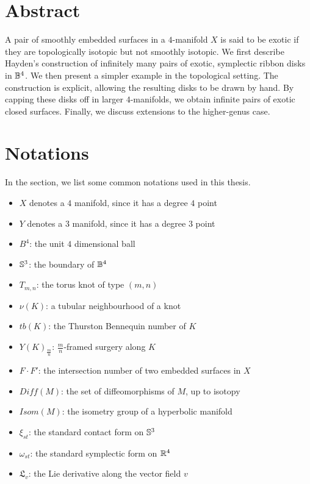 \documentclass[12pt,a4paper,oneside]{book}
\begin{document}
\chapter*{Abstract}
A pair of smoothly embedded surfaces in a $4$-manifold $X$ is said to be exotic if they are topologically isotopic but not smoothly isotopic. We first describe Hayden's construction of infinitely many pairs of exotic, symplectic ribbon disks in $\mathbb{B}^4$. We then present a simpler example in the topological setting. The construction is explicit, allowing the resulting disks to be drawn by hand. By capping these disks off in larger $4$-manifolds, we obtain infinite pairs of exotic closed surfaces. Finally, we discuss extensions to the higher-genus case.
\chapter*{Notations}
In the section, we list some common notations used in this thesis. 
\begin{itemize}
\item $X$ denotes a $4$ manifold, since it has a degree $4$ point
\item $Y$ denotes a $3$ manifold, since it has a degree $3$ point
\item $B^4$: the unit $4$ dimensional ball
\item $\mathbb{S}^3$: the boundary of $\mathbb{B}^4$
\item $T_{m, n}$: the torus knot of type $(m, n)$
\item $\nu(K)$: a tubular neighbourhood of a knot
\item $tb(K)$: the Thurston Bennequin number of $K$
\item $Y(K)_{\frac{m}{n}}$: $\frac{m}{n}$-framed surgery along $K$
\item $F \cdot F'$: the intersection number of two embedded surfaces in $X$
\item $Diff(M)$: the set of diffeomorphisms of $M$, up to isotopy
\item $Isom(M)$: the isometry group of a hyperbolic manifold
\item $\xi_{st}$: the standard contact form on $\mathbb{S}^3$
\item $\omega_{st}$: the standard symplectic form on $\mathbb{R}^4$
\item $\mathfrak{L}_v$: the Lie derivative along the vector field $v$
\end{itemize}

\cleardoublepage
\tableofcontents
{}
\end{document}
